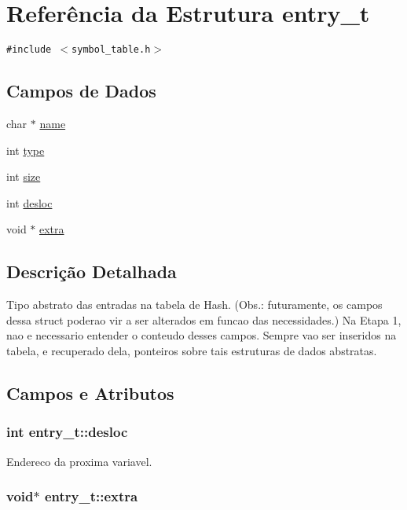 \hypertarget{structentry__t}{
\section{Referência da Estrutura entry\_\-t}
\label{structentry__t}
}
{\tt \#include $<$symbol\_\-table.h$>$}

\subsection*{Campos de Dados}
\begin{CompactItemize}
\item 
char $\ast$ \hyperlink{structentry__t_b04f7c44381c01e411be318875eb5eb6}{name}
\item 
int \hyperlink{structentry__t_f284680fed934779f16fc2b6a42101b1}{type}
\item 
int \hyperlink{structentry__t_67460ae77b6a4433d48f7736ee6a500a}{size}
\item 
int \hyperlink{structentry__t_bc62dec01315bbb72bff20ce69d8ef37}{desloc}
\item 
void $\ast$ \hyperlink{structentry__t_6f7a7b18bd57fafba8d1f2d257ac3863}{extra}
\end{CompactItemize}


\subsection{Descrição Detalhada}
Tipo abstrato das entradas na tabela de Hash. (Obs.: futuramente, os campos dessa struct poderao vir a ser alterados em funcao das necessidades.) Na Etapa 1, nao e necessario entender o conteudo desses campos. Sempre vao ser inseridos na tabela, e recuperado dela, ponteiros sobre tais estruturas de dados abstratas. 

\subsection{Campos e Atributos}
\hypertarget{structentry__t_bc62dec01315bbb72bff20ce69d8ef37}{
\subsubsection[{desloc}]{\setlength{\rightskip}{0pt plus 5cm}int {\bf entry\_\-t::desloc}}}
\label{structentry__t_bc62dec01315bbb72bff20ce69d8ef37}


Endereco da proxima variavel. \hypertarget{structentry__t_6f7a7b18bd57fafba8d1f2d257ac3863}{
\subsubsection[{extra}]{\setlength{\rightskip}{0pt plus 5cm}void$\ast$ {\bf entry\_\-t::extra}}}
\label{structentry__t_6f7a7b18bd57fafba8d1f2d257ac3863}


